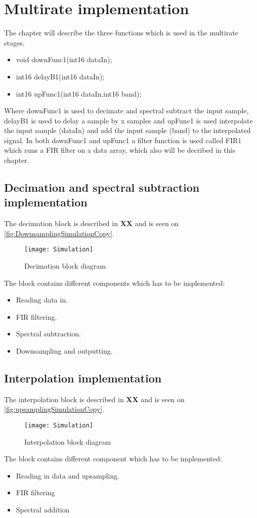 \chapter{Multirate implementation}
The chapter will describe the three functions which is used in the multirate stages.
\begin{itemize}
\item void downFunc1(int16 dataIn);
\item int16 delayB1(int16 dataIn);
\item int16 upFunc1(int16 dataIn,int16 band);
\end{itemize}
Where downFunc1 is used to decimate and spectral subtract the input sample, delayB1 is used to delay a sample by x samples and upFunc1 is used interpolate the input sample (dataIn) and add the input sample (band) to the interpolated signal. In both downFunc1 and upFunc1 a filter function is used called FIR1 which runs a FIR filter on a data array, which also will be decribed in this chapter. 



\section{Decimation and spectral subtraction implementation}
The decimation block is described in \textbf{XX} and is seen on \autoref{fig:DownsamplingSimulationCopy}.
\begin{figure}[H]
    \centering
	\texttt{[image: Simulation]}
    \caption{Decimation block diagram}
    \label{fig:DownsamplingSimulationCopy}
\end{figure}
The block contains different components which has to be implemented:
\begin{itemize}
\item Reading data in.
\item FIR filtering.
\item Spectral subtraction.
\item Downsampling and outputting. 
\end{itemize}




\section{Interpolation implementation}
The interpolation block is described in \textbf{XX} and is seen on \autoref{fig:upsamplingSimulationCopy}.
\begin{figure}[H]
    \centering
	\texttt{[image: Simulation]}
    \caption{Interpolation block diagram}
    \label{fig:upsamplingSimulationCopy}
\end{figure}
The block contains different component which has to be implemented:
\begin{itemize}
\item Reading in data and upsampling.
\item FIR filtering
\item Spectral addition
\end{itemize}


